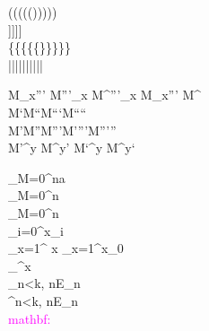 

\Biggl(\biggl(\Bigl(\bigl(()\bigr)\Bigr)\biggr)\Biggr)
\\
\Biggl[\biggl[\Bigl[\bigl[[]\bigr]\Bigr]\biggr]\Biggr]
\\
\Biggl\{\biggl\{\Bigl\{\bigl\{\{\}\bigr\}\Bigr\}\biggr\}\Biggr\}
\\
\Biggl|\biggl|\Bigl|\bigl|||\bigr|\Bigr|\biggr|\Biggr|


M_x''' M'''_x M^{'''}_x M_x{'''} M^{\prime\backprime}
\\
M`M``M```M````
\\
M'M''M'''M''''M'''''
\\
M'^y M^y' M`^y M^y`



\int_{M=0}^na \\
\sum_{M=0}^n \\
\int\limits_{M=0}^n \\
\sideset{_*^*}{_*^*}\prod_{i=0}^\infty x_i \\

\sum_{x=1}^{\infty} x
\sum_{x=1}^\infty x_0
\\
\sum_{}^\infty x
\\
\sum_{n<k,\;} nE_n
\\
\sum^{n<k,\;} nE_n
\\


\textcolor{magenta}{mathbf:}\\
\\
\\
\\
\mathbf{\Alpha\Beta\Gamma\Delta\Epsilon\Zeta\Eta\Theta\Iota
\Kappa\Lambda\Mu\Nu\Xi\Omicron\Pi\Rho\Sigma\Tau
\Upsilon\Phi\Chi\Psi\Omega\nabla}\\

